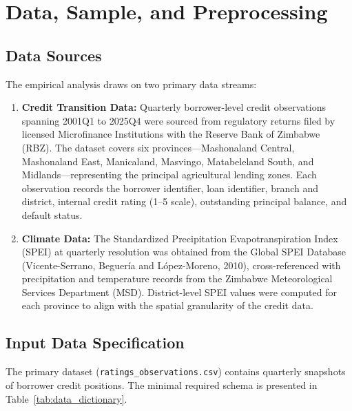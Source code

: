\documentclass[12pt,a4paper]{article}
\begin{document}
\section{Data, Sample, and Preprocessing}

\subsection{Data Sources}

The empirical analysis draws on two primary data streams:

\begin{enumerate}[noitemsep]
    \item \textbf{Credit Transition Data:} Quarterly borrower-level credit observations spanning 2001Q1 to 2025Q4 were sourced from regulatory returns filed by licensed Microfinance Institutions with the Reserve Bank of Zimbabwe (RBZ). The dataset covers six provinces---Mashonaland Central, Mashonaland East, Manicaland, Masvingo, Matabeleland South, and Midlands---representing the principal agricultural lending zones. Each observation records the borrower identifier, loan identifier, branch and district, internal credit rating (1--5 scale), outstanding principal balance, and default status.
    \item \textbf{Climate Data:} The Standardized Precipitation Evapotranspiration Index (SPEI) at quarterly resolution was obtained from the Global SPEI Database (Vicente-Serrano, Beguer\'ia and L\'opez-Moreno, 2010), cross-referenced with precipitation and temperature records from the Zimbabwe Meteorological Services Department (MSD). District-level SPEI values were computed for each province to align with the spatial granularity of the credit data.
\end{enumerate}

\subsection{Input Data Specification}

The primary dataset (\texttt{ratings\_observations.csv}) contains quarterly snapshots of borrower credit positions. The minimal required schema is presented in Table~\ref{tab:data_dictionary}.
\end{document}
